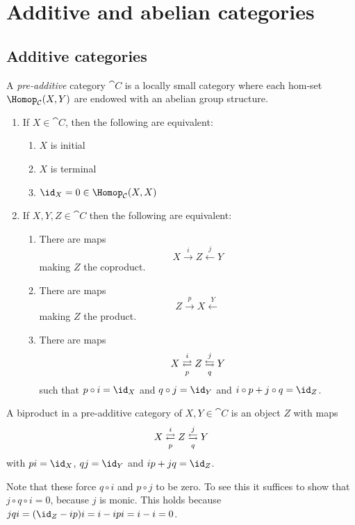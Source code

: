 \documentclass[../main.tex]{subfiles}
\begin{document}
\chapter{Additive and abelian categories}
\section{Additive categories}
\begin{defn}
	A \emph{pre-additive} category $\cat C$ is a locally small category where each hom-set $\Hom_{\cat C}(X, Y)$ are endowed with an abelian group structure.
\end{defn}
\begin{lem}
\begin{enumerate}
	\item If $X \in \cat C$, then the following are equivalent:
	\begin{enumerate}
    	\item $X$ is initial
		\item $X$ is terminal
		\item $\id_X = 0 \in \Hom_{\cat C}(X,X)$
    \end{enumerate}
	\item If $X, Y, Z \in \cat C$ then the following are equivalent:
	\begin{enumerate}
    	\item There are maps \[X \xrightarrow{i} Z \xleftarrow{j} Y\] making $Z$ the coproduct.
    	\item There are maps \[Z \xrightarrow{p} X \xleftarrow Y\] making $Z$ the product.
		\item There are maps \[X \xrightleftarrows{i}[p] Z \xleftrightarrows{j}[q] Y\] such that $p \circ i = \id_X$ and $q \circ j = \id_Y$ and $i\circ p + j \circ q = \id_Z$.
    \end{enumerate}

\end{enumerate}

\end{lem}

\begin{defn}
	A biproduct in a pre-additive category of $X, Y \in \cat C$ is an object $Z$ with maps \[X \xrightleftarrows{i}[p] Z \xleftrightarrows{j}[q] Y\] with $pi = \id_X$, $qj = \id_Y$ and $ip + jq = \id_Z$.
\end{defn}
\begin{rmk}
	Note that these force $q \circ i$ and $p \circ j$ to be zero. To see this it suffices to show that $j \circ q \circ i = 0$, because $j$ is monic.
	This holds because $jqi = (\id_Z - ip)i = i - ipi = i - i = 0$.
\end{rmk}
\end{document}
